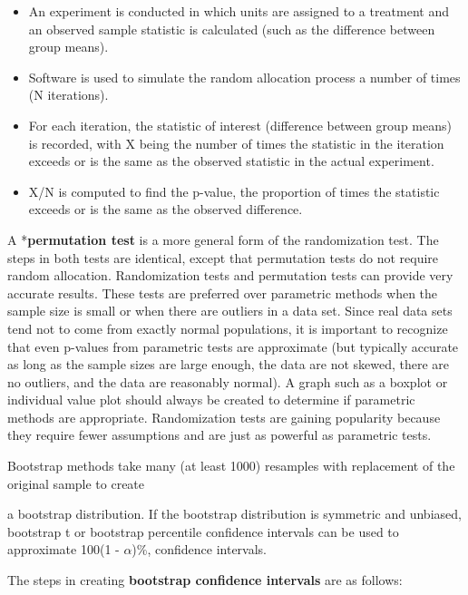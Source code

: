 \documentclass[
]{report}
\providecommand{\tightlist}{%
  \setlength{\itemsep}{0pt}\setlength{\parskip}{0pt}}
\begin{document}
\begin{itemize}
\tightlist
\item
  An experiment is conducted in which units are assigned to a treatment and an observed sample statistic is calculated (such as the difference between group means).
\item
  Software is used to simulate the random allocation process a number of times (N iterations).
\item
  For each iteration, the statistic of interest (difference between group means) is recorded, with X being
  the number of times the statistic in the iteration exceeds or is the same as the observed statistic in the
  actual experiment.
\item
  X/N is computed to find the p-value, the proportion of times the statistic exceeds or is the same as the
  observed difference.
\end{itemize}

A *\textbf{permutation test} is a more general form of the randomization test. The steps in both tests are identical, except that permutation tests do not require random allocation. Randomization tests and permutation tests can provide very accurate results. These tests are preferred over parametric methods when the sample size is small or when there are outliers in a data set. Since real data sets tend not to come from exactly normal populations, it is important to recognize that even p-values from parametric tests are approximate (but typically accurate as long as the sample sizes are large enough, the data are not skewed, there are no outliers, and the data are reasonably normal). A graph such as a boxplot or individual value plot should always be created to determine if parametric methods are appropriate. Randomization tests are gaining popularity because they require fewer assumptions and are just as powerful as parametric tests.

Bootstrap methods take many (at least 1000) resamples with replacement of the original sample to create

a bootstrap distribution. If the bootstrap distribution is symmetric and unbiased, bootstrap t or bootstrap
percentile confidence intervals can be used to approximate 100(1 - \(\alpha\))\%, confidence intervals.

The steps in creating \textbf{bootstrap confidence intervals} are as follows:
\end{document}
